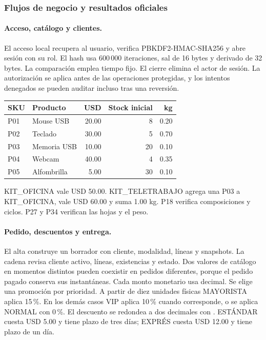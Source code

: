 \subsubsection{Flujos de negocio y resultados oficiales}
\paragraph{Acceso, catálogo y clientes.}
El acceso local recupera al usuario, verifica PBKDF2-HMAC-SHA256 y abre sesión con su rol. El hash usa 600\,000 iteraciones, sal de 16 bytes y derivado de 32 bytes. La comparación emplea tiempo fijo. El cierre elimina el actor de sesión. La autorización se aplica antes de las operaciones protegidas, y los intentos denegados se pueden auditar incluso tras una reversión.

\begin{center}\small
\begin{tabular}{@{}llrrr@{}}\toprule
SKU & Producto & USD & Stock inicial & kg\\\midrule
P01 & Mouse USB & 20.00 & 8 & 0.20\\
P02 & Teclado & 30.00 & 5 & 0.70\\
P03 & Memoria USB & 10.00 & 20 & 0.10\\
P04 & Webcam & 40.00 & 4 & 0.35\\
P05 & Alfombrilla & 5.00 & 30 & 0.10\\\bottomrule
\end{tabular}
\label{tab:catalogo-oficial}
\end{center}
KIT\_OFICINA vale USD 50.00. KIT\_TELETRABAJO agrega una P03 a KIT\_OFICINA, vale USD 60.00 y suma 1.00 kg. P18 verifica composiciones y ciclos. P27 y P34 verifican las hojas y el peso.

\paragraph{Pedido, descuentos y entrega.}
El alta construye un borrador con cliente, modalidad, líneas y snapshots. La cadena revisa cliente activo, líneas, existencias y estado. Dos valores de catálogo en momentos distintos pueden coexistir en pedidos diferentes, porque el pedido pagado conserva sus instantáneas. Cada monto monetario usa decimal. Se elige una promoción por prioridad. A partir de diez unidades físicas MAYORISTA aplica 15\,\%. En los demás casos VIP aplica 10\,\% cuando corresponde, o se aplica NORMAL con 0\,\%. El descuento se redondea a dos decimales con . ESTÁNDAR cuesta USD 5.00 y tiene plazo de tres días; EXPRÉS cuesta USD 12.00 y tiene plazo de un día.

